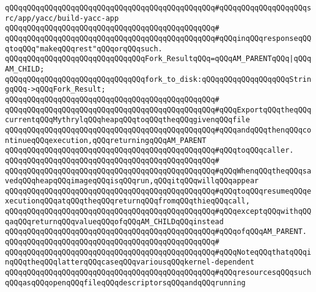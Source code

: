\verb|qQQqqQQqqQQqqQQqqQQqqQQqqQQqqQQqqQQqqQQqqQQqqQQq#qQQqqQQqqQQqqQQqqQQqsrc/app/yacc/build-yacc-app|\newline
\verb|qQQqqQQqqQQqqQQqqQQqqQQqqQQqqQQqqQQqqQQqqQQqqQQq#|\newline
\verb|qQQqqQQqqQQqqQQqqQQqqQQqqQQqqQQqqQQqqQQqqQQqqQQq#qQQqinqQQqresponseqQQqtoqQQq"makeqQQqrest"qQQqorqQQqsuch.|\newline
\newline
\newline
\verb|qQQqqQQqqQQqqQQqqQQqqQQqqQQqqQQqFork_ResultqQQq=qQQqAM_PARENTqQQq|\verb#|qQQqAM_CHILD;#\newline
\newline
\verb|qQQqqQQqqQQqqQQqqQQqqQQqqQQqqQQqfork_to_disk:qQQqqQQqqQQqqQQqqQQqStringqQQq->qQQqFork_Result;|\newline
\verb|qQQqqQQqqQQqqQQqqQQqqQQqqQQqqQQqqQQqqQQqqQQqqQQq#|\newline
\verb|qQQqqQQqqQQqqQQqqQQqqQQqqQQqqQQqqQQqqQQqqQQqqQQq#qQQqExportqQQqtheqQQqcurrentqQQqMythrylqQQqheapqQQqtoqQQqtheqQQqgivenqQQqfile|\newline
\verb|qQQqqQQqqQQqqQQqqQQqqQQqqQQqqQQqqQQqqQQqqQQqqQQq#qQQqandqQQqthenqQQqcontinueqQQqexecution,qQQqreturningqQQqAM_PARENT|\newline
\verb|qQQqqQQqqQQqqQQqqQQqqQQqqQQqqQQqqQQqqQQqqQQqqQQq#qQQqtoqQQqcaller.|\newline
\verb|qQQqqQQqqQQqqQQqqQQqqQQqqQQqqQQqqQQqqQQqqQQqqQQq#|\newline
\verb|qQQqqQQqqQQqqQQqqQQqqQQqqQQqqQQqqQQqqQQqqQQqqQQq#qQQqWhenqQQqtheqQQqsavedqQQqheapqQQqimageqQQqisqQQqrun,qQQqitqQQqwillqQQqappear|\newline
\verb|qQQqqQQqqQQqqQQqqQQqqQQqqQQqqQQqqQQqqQQqqQQqqQQq#qQQqtoqQQqresumeqQQqexecutionqQQqatqQQqtheqQQqreturnqQQqfromqQQqthieqQQqcall,|\newline
\verb|qQQqqQQqqQQqqQQqqQQqqQQqqQQqqQQqqQQqqQQqqQQqqQQq#qQQqexceptqQQqwithqQQqaqQQqreturnqQQqvalueqQQqofqQQqAM_CHILDqQQqinstead|\newline
\verb|qQQqqQQqqQQqqQQqqQQqqQQqqQQqqQQqqQQqqQQqqQQqqQQq#qQQqofqQQqAM_PARENT.|\newline
\verb|qQQqqQQqqQQqqQQqqQQqqQQqqQQqqQQqqQQqqQQqqQQqqQQq#|\newline
\verb|qQQqqQQqqQQqqQQqqQQqqQQqqQQqqQQqqQQqqQQqqQQqqQQq#qQQqNoteqQQqthatqQQqinqQQqtheqQQqlatterqQQqcaseqQQqvariousqQQqkernel-dependent|\newline
\verb|qQQqqQQqqQQqqQQqqQQqqQQqqQQqqQQqqQQqqQQqqQQqqQQq#qQQqresourcesqQQqsuchqQQqasqQQqopenqQQqfileqQQqdescriptorsqQQqandqQQqrunning|\newline
